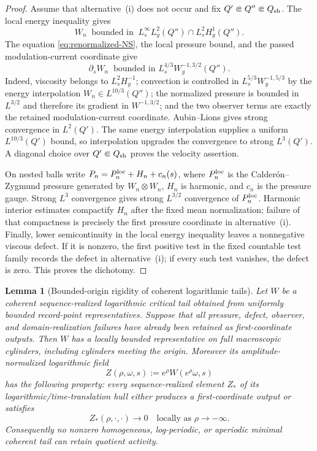 \documentclass[11pt]{amsart}
\numberwithin{equation}{section}
\theoremstyle{plain}
\newtheorem{lemma}[lemma]{Lemma}
\theoremstyle{definition}
\theoremstyle{remark}
\begin{document}
\begin{proof}
Assume that alternative~\textup{(i)} does not occur and fix
\(Q'\Subset Q''\Subset Q_{\rm sh}\).  The local energy inequality gives
\[
 W_n\ \text{ bounded in }\
 L^\infty_sL^2_y(Q'')\cap L^2_sH^1_y(Q'').
\]
The equation \eqref{eq:renormalized-NS}, the local pressure bound, and the
passed modulation-current coordinate give
\[
 \partial_sW_n\ \text{ bounded in }
 L^{4/3}_sW^{-1,3/2}_y(Q'').
\]
Indeed, viscosity belongs to \(L^2_sH^{-1}_y\); convection is controlled in
\(L^{5/3}_sW^{-1,5/3}_y\) by the energy interpolation
\(W_n\in L^{10/3}(Q'')\); the normalized pressure is bounded in
\(L^{3/2}\) and therefore its gradient in \(W^{-1,3/2}\);
and the two observer terms are exactly the retained modulation-current
coordinate.  Aubin--Lions gives strong convergence in \(L^2(Q')\).  The same
energy interpolation supplies a uniform \(L^{10/3}(Q')\) bound, so interpolation
upgrades the convergence to strong \(L^3(Q')\).  A diagonal choice over
\(Q'\Subset Q_{\rm sh}\) proves the velocity assertion.

On nested balls write \(P_n=P_n^{\rm loc}+H_n+c_n(s)\), where
\(P_n^{\rm loc}\) is the Calder\'on--Zygmund pressure generated by
\(W_n\otimes W_n\), \(H_n\) is harmonic, and \(c_n\) is the pressure gauge.
Strong \(L^3\) convergence gives strong \(L^{3/2}\) convergence of
\(P_n^{\rm loc}\).  Harmonic interior estimates compactify \(H_n\) after the
fixed mean normalization; failure of that compactness is precisely the first
pressure coordinate in alternative~\textup{(i)}.  Finally, lower
semicontinuity in the local energy inequality leaves a nonnegative viscous
defect.  If it is nonzero, the first positive test in the fixed countable test
family records the defect in alternative~\textup{(i)}; if every such test
vanishes, the defect is zero.  This proves the dichotomy.
\end{proof}

\begin{lemma}[Bounded-origin rigidity of coherent logarithmic tails]
\label{lem:bounded-origin-coherent-tail-rigidity}
Let \(W\) be a coherent sequence-realized logarithmic critical tail obtained
from uniformly bounded record-point representatives.  Suppose that all
pressure, defect, observer, and domain-realization failures have already been
retained as first-coordinate outputs.  Then \(W\) has a locally bounded
representative on full macroscopic cylinders, including cylinders meeting the
origin.  Moreover its amplitude-normalized logarithmic field
\[
 Z(\rho,\omega,s):=e^\rho W(e^\rho\omega,s)
\]
has the following property: every sequence-realized element \(Z_*\) of its
logarithmic/time-translation hull either produces a first-coordinate output or
satisfies
\begin{equation}\label{eq:coherent-tail-origin-decay}
 Z_*(\rho,\cdot,\cdot)\longrightarrow0
 \quad\text{locally as }\rho\to-\infty.
\end{equation}
Consequently no nonzero homogeneous, log-periodic, or aperiodic minimal
coherent tail can retain quotient activity.
\end{lemma}
\end{document}
